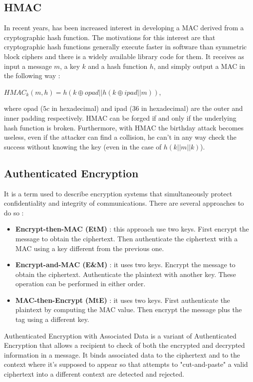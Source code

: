 \documentclass[11pt]{article}
\begin{document}
\subsection{HMAC}
In recent years, has been increased interest in developing a MAC derived from a cryptographic hash function. The motivations for this interest are that cryptographic hash functions generally execute faster in software than symmetric block ciphers and there is a widely available library code for them. It receives as input a message $m$, a key $k$ and a hash function $h$, and simply output a MAC in the following way :
\begin{center}
$HMAC_k(m, h) = h(k \oplus opad || h(k \oplus ipad || m))$,
\end{center}
where opad ($5c$ in hexadecimal) and ipad ($36$ in hexadecimal) are the outer and inner padding respectively. HMAC can be forged if and only if the underlying hash function is broken. Furthermore, with HMAC the birthday attack becomes useless, even if the attacker can find a collision, he can't in any way check the success without knowing the key (even in the case of $h(k || m || k)$).
\subsection{Authenticated Encryption}
It is a term used to describe encryption systems that simultaneously protect confidentiality and integrity of communications. There are several approaches to do so :
\begin{itemize}
\item \textbf{Encrypt-then-MAC (EtM)} : this approach use two keys. First encrypt the message to obtain the ciphertext. Then authenticate the ciphertext with a MAC using a key different from the previous one.
\item \textbf{Encrypt-and-MAC (E\&M)} : it uses two keys. Encrypt the message to obtain the ciphertext. Authenticate the plaintext with another key. These operation can be performed in either order.
\item \textbf{MAC-then-Encrypt (MtE)} : it uses two keys. First authenticate the plaintext by computing the MAC value. Then encrypt the message plus the tag using a different key.
\end{itemize}
Authenticated Encryption with Associated Data is a variant of Authenticated Encryption that allows a recipient to check of both the encrypted and decrypted information in a message. It binds associated data to the ciphertext and to the context where it's supposed to appear so that attempts to "cut-and-paste" a valid ciphertext into a different context are detected and rejected.
\end{document}
